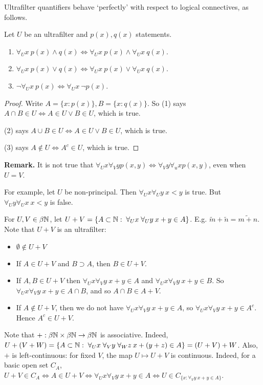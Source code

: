 \documentclass[10pt,a4paper]{article}
\begin{document}
Ultrafilter quantifiers behave `perfectly' with respect to logical connectives, as follows.
\begin{proposition}
  Let $U$ be an ultrafilter and $p(x), q(x)$ statements.
  \begin{enumerate}
    \item $\forall_U x\: p(x) \wedge q(x) \iff \forall_U x\: p(x) \wedge \forall_U x\: q(x)$.
    \item $\forall_U x\: p(x)\vee q(x) \iff \forall_U x\: p(x) \vee \forall_U x\: q(x)$.
    \item $\neg \forall_U x\: p(x) \iff \forall_U x\: \neg p(x)$.
  \end{enumerate}
\end{proposition}
\begin{proof}
  Write $A = \{x : p(x)\}, B = \{x: q(x)\}$. So (1) says $A\cap B \in U \iff A \in U \vee B \in U$, which is true.

  (2) says $A \cup B \in U \iff A \in U \vee B \in U$, which is true.

  (3) says $A \notin U \iff A^c \in U$, which is true.
\end{proof}
\textbf{Remark.} It is not true that $\forall_U x \forall_V y p(x,y) \iff \forall_V y \forall_u x p(x,y)$, even when $U =V$.

For example, let $U$ be non-principal. Then $\forall_U x \forall_U y\: x<y$ is true. But $\forall_U y \forall_U x\: x<y$ is false.

For $U, V \in \beta\mathbb{N}$, let $U+V = \{A \subset \N: \forall_U x \forall_U y\:x+y \in A\}$. E.g. $\tilde{m}+\tilde{n} = \tilde{m+n}$. Note that $U+V$ is an ultrafilter:
\begin{itemize}
  \item $\emptyset \notin U+V$
  \item If $A \in U+V$ and $B \supset A$, then $B \in U+V$.
  \item If $A,B \in U+V$ then $\forall_U x \forall_V y\: x+y \in A$ and $\forall_U x \forall_V y\: x+y \in B$. So $\forall_U x \forall_V y \: x+y \in A\cap B$, and so $A\cap B \in A+V$.
  \item If $A \notin U+V$, then we do not have $\forall_U x \forall_V y \: x+y \in A$, so $\forall_U x \forall_V y\: x+y \in A^c$. Hence $A^c \in U+V$.
\end{itemize}
Note that $+:\beta\mathbb{N} \times \beta \mathbb{N} \to \beta\mathbb{N}$ is associative. Indeed, $U+(V+W) = \{A \subset \N: \forall_U x \forall_V y \forall_W z\:x+(y+z)\in A\} = (U+V)+W$. Also, $+$ is left-continuous: for fixed $V$, the map $U \mapsto U+V$ is continuous. Indeed, for a basic open set $C_A$, $U+V \in C_A \iff A \in U+V \iff \forall_U x \forall_V y\:x+y \in A \iff U \in C_{\{x: \forall_V y\:x+y \in A\}}$.
\end{document}
